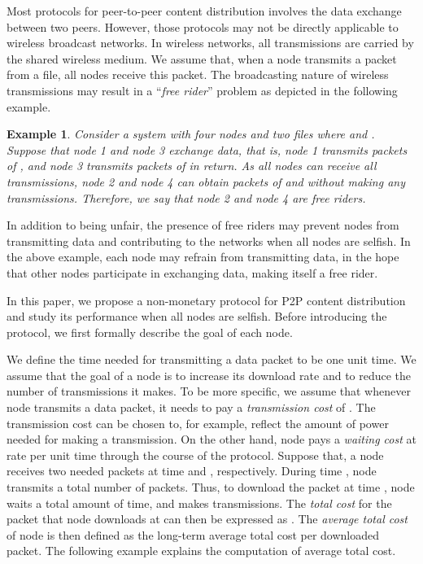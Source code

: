 \documentclass[11pt, conference]{IEEEtran}
\newtheorem{example}{Example}
\begin{document}
Most protocols for peer-to-peer content distribution involves the data exchange between two peers. However, those protocols may not be directly applicable to wireless broadcast networks. In wireless networks, all transmissions are carried by the shared wireless medium. We assume that, when a node transmits a packet from a file, all nodes receive this packet. The broadcasting nature of wireless transmissions may result in a ``\emph{free rider}'' problem as depicted in the following example.

\begin{example}
Consider a system with four nodes and two files where  and . Suppose that node 1 and node 3 exchange data, that is, node 1 transmits packets of , and node 3 transmits packets of  in return. As all nodes can receive all transmissions, node 2 and node 4 can obtain packets of  and  without making any transmissions. Therefore, we say that node 2 and node 4 are \emph{free riders}.
\end{example}

In addition to being unfair, the presence of free riders may prevent nodes from transmitting data and contributing to the networks when all nodes are selfish. In the above example, each node may refrain from transmitting data, in the hope that other nodes participate in exchanging data, making itself a free rider.

In this paper, we propose a non-monetary protocol for P2P content distribution and study its performance when all nodes are selfish. Before introducing the protocol, we first formally describe the goal of each node.

We define the time needed for transmitting a data packet to be one unit time. We assume that the goal of a node is to increase its download rate and to reduce the number of transmissions it makes. To be more specific, we assume that whenever node  transmits a data packet, it needs to pay a \emph{transmission cost} of . The transmission cost can be chosen to, for example, reflect the amount of power needed for making a transmission. On the other hand, node  pays a \emph{waiting cost} at rate  per unit time through the course of the protocol. Suppose that, a node  receives two needed packets at time  and , respectively. During time , node  transmits a total number of  packets. Thus, to download the packet at time , node  waits a total amount of  time, and makes  transmissions. The \emph{total cost} for the packet that node  downloads at  can then be expressed as . The \emph{average total cost} of node  is then defined as the long-term average total cost per downloaded packet. The following example explains the computation of average total cost.
\end{document}
